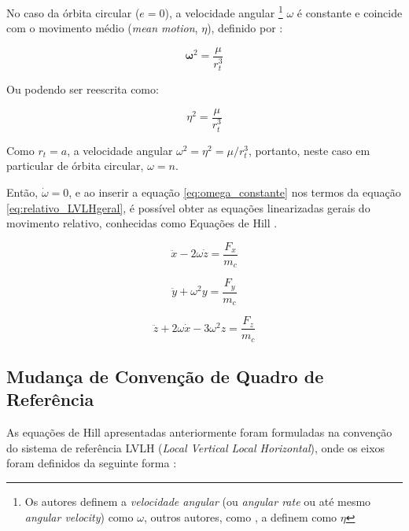 No caso da órbita circular ($e=0$), a velocidade angular
\footnote{Os autores \cite{fehse2003,sidi1997spacecraft} definem a \emph{velocidade angular} (ou \emph{angular rate} ou até mesmo \emph{angular velocity}) como $\omega$, outros autores, como \cite{bate1971}, a definem como $\eta$} 
$\omega$ é constante e coincide com o movimento médio (\emph{mean motion}, $\eta$), definido por \cite{fehse2003}:

\begin{equation}
\label{eq:omega_constante}
\boldsymbol\omega^2 = \frac{\mu}{r_t^3}
\end{equation}

Ou podendo ser reescrita como:

\begin{equation}
\label{eq:omega_constante2}
\eta^2 = \frac{\mu}{r_t^3}
\end{equation}

Como $r_t=a$, a velocidade angular $\omega^{2}= \eta^2 = \mu/r_t^{3}$, portanto, neste caso em particular de órbita circular, $\omega=n$.

Então, $\dot{\omega}=0$, e ao inserir a equação \eqref{eq:omega_constante} nos termos da equação \eqref{eq:relativo_LVLHgeral}, é possível obter as equações linearizadas gerais do movimento relativo, conhecidas como Equações de Hill \cite{hill1878,fehse2003, wie2008space}.

\begin{equation}
    \label{eq:equacoes_HillX}
\ddot{x} - 2\omega \dot{z} = \frac{F_x}{m_c}
\end{equation}

\begin{equation}
    \label{eq:equacoes_HillY}
\ddot{y} + \omega^2 y = \frac{F_y}{m_c}
\end{equation}

\begin{equation}
    \label{eq:equacoes_HillZ}
\ddot{z} + 2\omega \dot{x} - 3 \omega^2 z = \frac{F_z}{m_c}
\end{equation}

\subsection{Mudança de Convenção de Quadro de Referência}

As equações de Hill apresentadas anteriormente foram formuladas na convenção do sistema de referência LVLH (\emph{Local Vertical Local Horizontal}), onde os eixos foram definidos da seguinte forma \cite{fehse2003}:

